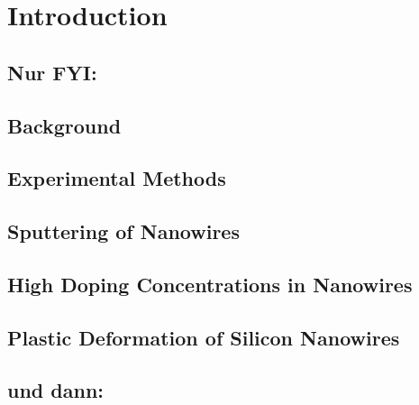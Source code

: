 \documentclass[12pt,
paper=a4,				
DIV=calc,		  %
BCOR=16mm,	  %
headinclude,
openany
]{scrbook}
\newcommand{\TODO}[1]{{\LARGE{\textcolor{red}{\emph {#1 }}}}}
\begin{document}


\clearpage
\small{\tableofcontents}

\chapter{Introduction}
\onehalfspacing



\clearpage
\section{Nur FYI:}
\section{Background}
\section{Experimental Methods}
\section{Sputtering of Nanowires}
\section{High Doping Concentrations in Nanowires}
\section{Plastic Deformation of Silicon Nanowires}
\section{und dann:}
%

%



%

%




\newpage



\end{document}
